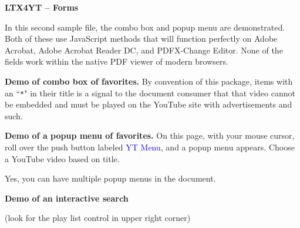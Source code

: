 \documentclass{article}
\begin{document}
\maketitle

\begin{center}\bfseries\Large\color{blue}LTX4YT -- Forms\end{center}

In this second sample file, the combo box and popup menu are
demonstrated. Both of these use JavaScript methods that will
function perfectly on \textsf{Adobe Acrobat}, \textsf{Adobe
Acrobat Reader DC}, and \textsf{PDFX-Change Editor}. None of the fields
work within the native PDF viewer of modern browsers.

\textbf{Demo of combo box of favorites.} By convention of this
package, items with an ``\texttt{*}" in their title is a signal to
the document consumer that that video cannot be
embedded and must be played on the YouTube site with
advertisements and such. \vspace{-\parskip}
\begin{quote}
\olBdry
\end{quote}

\textbf{Demo of a popup menu of favorites.}
On this page, with your mouse cursor, roll over the push button labeled \textcolor{blue}{\textsf{YT Menu}}, and a popup
menu appears. Choose a YouTube video based on title.

 Yes, you can have multiple popup menus in the document.

\textbf{Demo of an interactive search}\\[3pt]
\ytInputQuery{1.5in}{11bp}\olBdry
\ytSearch{}{11bp}\olBdry
\ytClearQuery{}{11bp}

 (look for the play list control in upper right corner)

\end{document}
